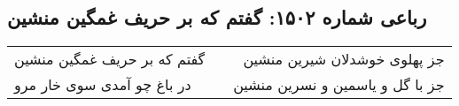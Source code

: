 \begin{center}
\section*{رباعی شماره ۱۵۰۲: گفتم که بر حریف غمگین منشین}
\label{sec:1502}
\begin{longtable}{l p{0.5cm} r}
گفتم که بر حریف غمگین منشین
&&
جز پهلوی خوشدلان شیرین منشین
\\
در باغ چو آمدی سوی خار مرو
&&
جز با گل و یاسمین و نسرین منشین
\\
\end{longtable}
\end{center}
